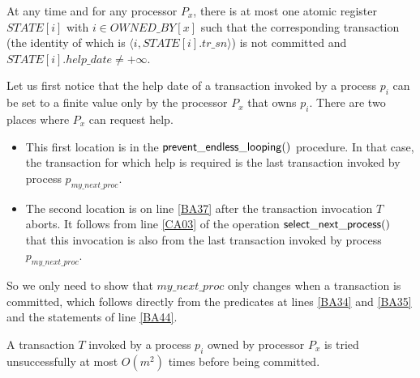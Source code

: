 \begin{lemma}
\label{lemma:1max} 
At any time and  for any processor $P_x$, there is at most one atomic register 
$\mathit{STATE}[i]$ with  $i\in \mathit{OWNED\_BY}[x]$ such that
the corresponding transaction 
(the identity of which is $\langle i, \mathit{STATE}[i].tr\_sn\rangle$)
 is not committed and $\mathit{STATE}[i].help\_date\neq +\infty$. 
\end{lemma}

\begin{proofL}
Let us first notice  that the  help date of a transaction invoked by a 
process $p_i$ can be set to  a finite value  only by the  processor $P_x$ 
that owns $p_i$.  There are two places where $P_x$  can request help. 
\begin{itemize}
\item 
This first location is in  the ${\sf prevent\_endless\_looping}()$ procedure.
In that  case, the  transaction  for which  help  is required is  the last
transaction invoked by  process $p_{my\_next\_proc}$. 
\item 
The second  location is on line  \ref{BA37} after the  transaction 
invocation  $T$ aborts. 
It follows from line \ref{CA03} of  the operation ${\sf  select\_next\_process}()$   
that  this invocation is also from  the last
transaction invoked by  process $p_{my\_next\_proc}$. 
\end{itemize}
So  we  only  need  to  show  that $my\_next\_proc$  only  changes  when  a
transaction is committed, which  follows directly from the predicates at lines 
 \ref{BA34} and  \ref{BA35} and the statements of line  \ref{BA44}. 
\renewcommand{\toto}{lemma:1max}
\end{proofL}   

\begin{theorem}
\label{proof:try-bounds}
A transaction $T$  invoked by a process $p_i$ owned by processor  $P_x$ 
is tried unsuccessfully  at most $O(m^2)$  times  before being  committed.
\end{theorem}


